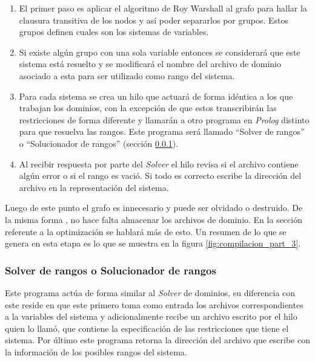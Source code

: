 \begin{enumerate}
 \item {El primer paso es aplicar el algoritmo de Roy Warshall \cite{CLR90} al 
  grafo para hallar la clausura transitiva de los nodos y así poder separarlos 
  por grupos. Estos grupos definen cuales son los sistemas de variables.}
 \item {Si existe algún grupo con una sola variable entonces se considerará que 
  este sistema está resuelto y se modificará el nombre del archivo de dominio 
  asociado a esta para ser utilizado como rango del sistema.}
 \item {Para cada sistema se crea un hilo que actuará de forma idéntica a los que 
  trabajan los dominios, con la excepción de que estos transcribirán las 
  restricciones de forma diferente y llamarán a otro programa en \emph{Prolog} distinto 
  para que resuelva las rangos. Este programa será llamado ``Solver de rangos'' 
  o ``Solucionador de rangos'' (sección \ref{sol_rangos}).}
 \item {Al recibir respuesta por parte del \emph{Solver} el hilo revisa si el archivo 
  contiene algún error o si el rango es vació. Si todo es correcto escribe la 
  dirección del archivo en la representación del sistema.}
\end{enumerate}

Luego de este punto el grafo es innecesario y puede ser olvidado o destruido. De la misma forma ,
no hace falta almacenar los archivos de dominio. En la sección referente a 
la optimización se hablará más de esto. Un resumen de lo que se genera en esta 
etapa es lo que se muestra en la figura \ref{fig:compilacion_part_3}.

\subsubsection{Solver de rangos o Solucionador de rangos}
\label{sol_rangos}
Este programa actúa de forma similar al \emph{Solver} de dominios, su diferencia con 
este reside en que este primero toma como entrada los archivos correspondientes a 
la variables del sistema y adicionalmente recibe un archivo escrito por el hilo 
quien lo llamó, que contiene la especificación de las restricciones que tiene el 
sistema. Por último este programa retorna la dirección del archivo que escribe 
con la información de los posibles rangos del sistema.

